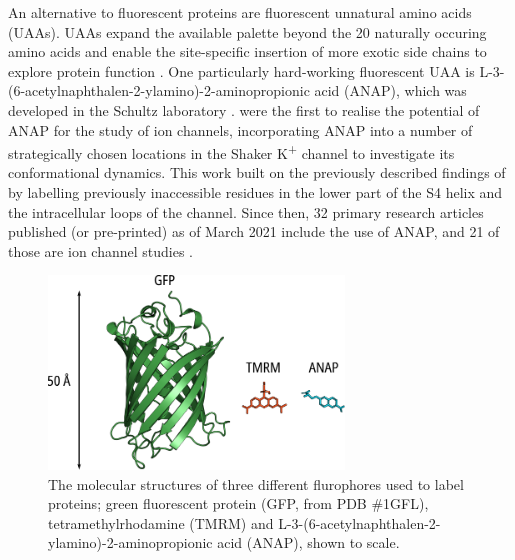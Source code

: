 An alternative to fluorescent proteins are fluorescent unnatural amino acids (UAAs).
UAAs expand the available palette beyond the 20 naturally occuring amino acids and enable the site-specific insertion of more exotic side chains to explore protein function \cite{pless_unnatural_2013, zheng_handbook_2015, cowgill_contribution_2019, braun_current_2020, puljung_anap_2021}.
One particularly hard-working fluorescent UAA is L-3-(6-acetylnaphthalen-2-ylamino)-2-aminopropionic acid (ANAP), which was developed in the Schultz laboratory \cite{lee_genetic_2009, chatterjee_genetically_2013}.
\textcite{kalstrup_dynamics_2013} were the first to realise the potential of ANAP for the study of ion channels, incorporating ANAP into a number of strategically chosen locations in the Shaker K\textsuperscript{+} channel to investigate its conformational dynamics.
This work built on the previously described findings of \textcite{cha_characterizing_1997} by labelling previously inaccessible residues in the lower part of the S4 helix and the intracellular loops of the channel.
Since then, 32 primary research articles published (or pre-printed) as of March 2021 include the use of ANAP, and 21 of those are ion channel studies \cite{puljung_anap_2021}.

\begin{figure}[hbtp]
	\centering
	\includegraphics[width=0.7\textwidth]{fluorophore_sizes.pdf}
	\caption[Contrasting sizes of flurophores]{
	{\bf{}}
	The molecular structures of three different flurophores used to label proteins; green fluorescent protein (GFP, from PDB \#1GFL), tetramethylrhodamine (TMRM) and L-3-(6-acetylnaphthalen-2-ylamino)-2-aminopropionic acid (ANAP), shown to scale.
	}\label{ch1fig:fluorophore_sizes}
\end{figure}

